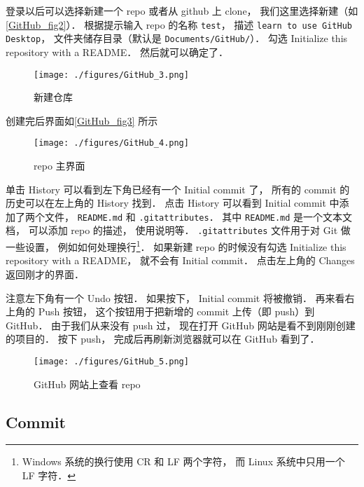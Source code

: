 登录以后可以选择新建一个 repo 或者从 github 上 clone， 我们这里选择新建（如\autoref{GitHub_fig2}）． 根据提示输入 repo 的名称 \lstinline|test|， 描述 \lstinline|learn to use GitHub Desktop|， 文件夹储存目录（默认是 \lstinline|Documents/GitHub/|）． 勾选 Initialize this repository with a README． 然后就可以确定了．

\begin{figure}[ht]
\centering
\texttt{[image: ./figures/GitHub\_3.png]}
\caption{新建仓库} \label{GitHub_fig2}
\end{figure}

创建完后界面如\autoref{GitHub_fig3} 所示
\begin{figure}[ht]
\centering
\texttt{[image: ./figures/GitHub\_4.png]}
\caption{repo 主界面} \label{GitHub_fig3}
\end{figure}

单击 History 可以看到左下角已经有一个 Initial commit 了， 所有的 commit 的历史可以在左上角的 History 找到． 点击 History 可以看到 Initial commit 中添加了两个文件， \lstinline|README.md| 和 \lstinline|.gitattributes|． 其中 \lstinline|README.md| 是一个文本文档， 可以添加 repo 的描述， 使用说明等． \lstinline|.gitattributes| 文件用于对 Git 做一些设置， 例如如何处理换行\footnote{Windows 系统的换行使用 CR 和 LF 两个字符， 而 Linux 系统中只用一个 LF 字符．}． 如果新建 repo 的时候没有勾选 Initialize this repository with a README， 就不会有 Initial commit． 点击左上角的 Changes 返回刚才的界面．

注意左下角有一个 Undo 按钮． 如果按下， Initial commit 将被撤销． 再来看右上角的 Push 按钮， 这个按钮用于把新增的 commit 上传（即 push）到 GitHub． 由于我们从来没有 push 过， 现在打开 GitHub 网站是看不到刚刚创建的项目的． 按下 push， 完成后再刷新浏览器就可以在 GitHub 看到了．
\begin{figure}[ht]
\centering
\texttt{[image: ./figures/GitHub\_5.png]}
\caption{GitHub 网站上查看 repo} \label{GitHub_fig5}
\end{figure}

\subsection{Commit}
